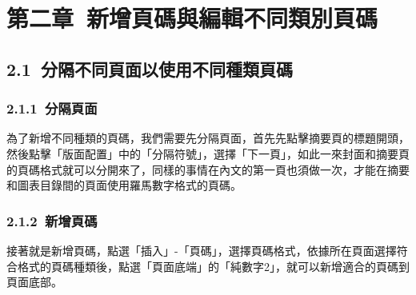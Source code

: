 
\section*{第二章\ 新增頁碼與編輯不同類別頁碼}

\subsection*{2.1\ 分隔不同頁面以使用不同種類頁碼}

\subsubsection*{2.1.1\ 分隔頁面}
為了新增不同種類的頁碼，我們需要先分隔頁面，首先先點擊摘要頁的標題開頭，然後點擊「版面配置」中的「分隔符號」，選擇「下一頁」，如此一來封面和摘要頁的頁碼格式就可以分開來了，同樣的事情在內文的第一頁也須做一次，才能在摘要和圖表目錄間的頁面使用羅馬數字格式的頁碼。
 
\subsubsection*{2.1.2\ 新增頁碼}
接著就是新增頁碼，點選「插入」-「頁碼」，選擇頁碼格式，依據所在頁面選擇符合格式的頁碼種類後，點選「頁面底端」的「純數字2」，就可以新增適合的頁碼到頁面底部。
\clearpage